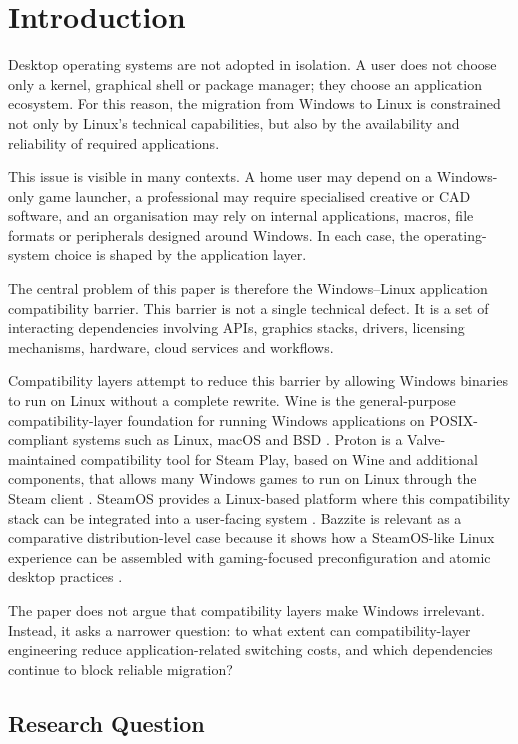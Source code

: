 \documentclass[conference]{IEEEtran}
\begin{document}
\section{Introduction}

Desktop operating systems are not adopted in isolation. A user does not choose only a kernel, graphical shell or package manager; they choose an application ecosystem. For this reason, the migration from Windows to Linux is constrained not only by Linux's technical capabilities, but also by the availability and reliability of required applications.

This issue is visible in many contexts. A home user may depend on a Windows-only game launcher, a professional may require specialised creative or CAD software, and an organisation may rely on internal applications, macros, file formats or peripherals designed around Windows. In each case, the operating-system choice is shaped by the application layer.

The central problem of this paper is therefore the Windows--Linux application compatibility barrier. This barrier is not a single technical defect. It is a set of interacting dependencies involving APIs, graphics stacks, drivers, licensing mechanisms, hardware, cloud services and workflows.

Compatibility layers attempt to reduce this barrier by allowing Windows binaries to run on Linux without a complete rewrite. Wine is the general-purpose compatibility-layer foundation for running Windows applications on POSIX-compliant systems such as Linux, macOS and BSD \cite{winehqAbout}. Proton is a Valve-maintained compatibility tool for Steam Play, based on Wine and additional components, that allows many Windows games to run on Linux through the Steam client \cite{valveProton}. SteamOS provides a Linux-based platform where this compatibility stack can be integrated into a user-facing system \cite{steamOSDownload}. Bazzite is relevant as a comparative distribution-level case because it shows how a SteamOS-like Linux experience can be assembled with gaming-focused preconfiguration and atomic desktop practices \cite{bazziteDocs,bazziteFedoraAtomicComparison}.

The paper does not argue that compatibility layers make Windows irrelevant. Instead, it asks a narrower question: to what extent can compatibility-layer engineering reduce application-related switching costs, and which dependencies continue to block reliable migration?

\subsection{Research Question}
\end{document}
